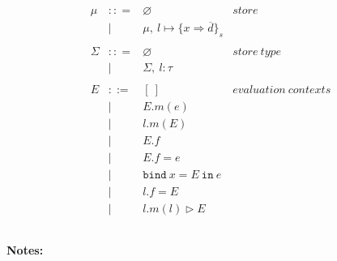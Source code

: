 \documentclass{llncs}
\newcommand{\keywadj}[1]{\mathtt{#1}}
\newcommand{\keyw}[1]{\keywadj{#1}~}
\begin{document}
\[\begin{array}{lll}
\begin{array}{lllr}
\mu & :: = & \varnothing & store\\
& | & \mu,~l \mapsto \{ x \Rightarrow \overline{d} \}_{s}\\
&&\\
\Sigma & :: = & \varnothing & store~type\\
& | & \Sigma,~l : \tau\\
&&\\
E & ::= & [~] & evaluation~ contexts\\
  & |   & E.m(e)\\
  & |   & l.m(E)\\
  & |   & E.f \\
  & |   & E.f = e \\
  & |   & \keyw{bind} x = E~\keyw{in} e \\
  & |   & l.f = E \\
  & |   & l.m(l) \rhd E \\
&&\\
\end{array}
\end{array}
\]

\noindent \textbf{Notes:}
\end{document}
